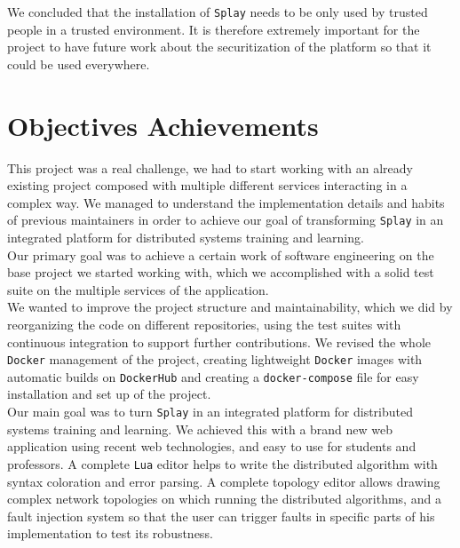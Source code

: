 \documentclass{eplmastersthesis}
\begin{document}
        We concluded that the installation of \texttt{Splay} needs to be only
        used by trusted people in a trusted environment. It is therefore
        extremely important for the project to have future work about the
        securitization of the platform so that it could be used everywhere.

    \section{Objectives Achievements}

      This project was a real challenge, we had to start working with an
      already existing project composed with multiple different services
      interacting in a complex way. We managed to understand the
      implementation details and habits of previous maintainers in order to
      achieve our goal of transforming \texttt{Splay} in an
      integrated platform for distributed systems training and learning.\\

      Our primary goal was to achieve a certain work of software engineering on
      the base project we started working with, which we accomplished with
      a solid test suite on the multiple services of the application.\\
      We wanted to improve the project structure and maintainability, which
      we did by reorganizing the code on different repositories, using
      the test suites with continuous integration to support further
      contributions. We revised the whole \texttt{Docker} management of
      the project, creating lightweight \texttt{Docker} images with automatic
      builds on \texttt{DockerHub} and creating a \texttt{docker-compose} file
      for easy installation and set up of the project.\\

      Our main goal was to turn \texttt{Splay} in an integrated platform for
      distributed systems training and learning. We achieved this with a
      brand new web application using recent web technologies, and easy
      to use for students and professors. A complete \texttt{Lua} editor helps to
      write the distributed algorithm with syntax coloration and error
      parsing. A complete topology editor allows drawing complex network
      topologies on which running the distributed algorithms, and a fault
      injection system so that the user can trigger faults in specific
      parts of his implementation to test its robustness.\\
\end{document}
